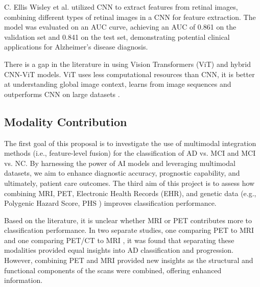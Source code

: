 C. Ellis Wisley et al. \cite{wisely_convolutional_2022}utilized CNN to extract features from retinal images, combining different types of retinal images in a CNN for feature extraction. The model was evaluated on an AUC curve, achieving an AUC of 0.861 on the validation set and 0.841 on the test set, demonstrating potential clinical applications for Alzheimer's disease diagnosis. 

There is a gap in the literature in using Vision Transformers (ViT) and hybrid CNN-ViT models. ViT uses less computational resources than CNN, it is better at understanding global image context, learns from image sequences and outperforms CNN on large datasets \cite{dosovitskiy_image_2021}. 

\subsection{Modality Contribution}
The first goal of this proposal is to investigate the use of multimodal integration methods (i.e., feature-level fusion) for the classification of AD vs. MCI and MCI vs. NC. By harnessing the power of AI models and leveraging multimodal datasets, we aim to enhance diagnostic accuracy, prognostic capability, and ultimately, patient care outcomes. The third aim of this project is to assess how combining MRI, PET, Electronic Health Records (EHR), and genetic data (e.g., Polygenic Hazard Score, PHS \cite{desikan_genetic_2017}) improves classification performance.

Based on the literature, it is unclear whether MRI or PET contributes more to classification performance. In two separate studies, one comparing PET to MRI \cite{wisely_convolutional_2022} and one comparing PET/CT to MRI \cite{zhang_petmr_2017}, it was found that separating these modalities provided equal insights into AD classification and progression. However, combining PET and MRI provided new insights as the structural and functional components of the scans were combined, offering enhanced information. 

